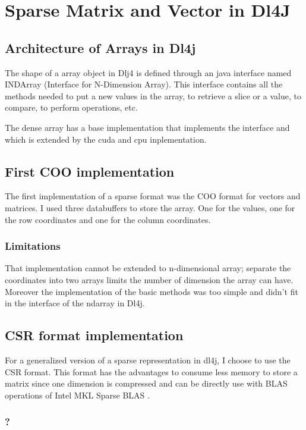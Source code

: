 \chapter{Sparse Matrix and Vector in Dl4J}

\section{Architecture of Arrays in Dl4j}

The shape of a array object in Dlj4 is defined through an java interface named INDArray (Interface for N-Dimension Array). This interface contains all the methods needed to put a new values in the array, to retrieve a slice or a value, to compare, to perform operations, etc.

The dense array has a base implementation that implements the  interface and which is extended by the cuda and cpu inplementation.
	

\section{First COO implementation}

The first implementation of a sparse format was the COO format for vectors and matrices. I used three databuffers to store the array. One for the values, one for the row coordinates and one for the column coordinates.

\subsection{Limitations}
That implementation cannot be extended to n-dimensional array; separate the coordinates into two arrays limits the number of dimension the array can have.
Moreover the implementation of the basic methods was too simple and didn't fit in the interface of the ndarray in Dl4j.

\section{CSR format implementation}

For a generalized version of a sparse representation in dl4j, I choose to use the CSR format. This format has the advantages to consume less memory to store a matrix since one dimension is compressed and can be directly use with BLAS operations of Intel MKL Sparse BLAS \cite{mklFormat}.

\subsection{?}

